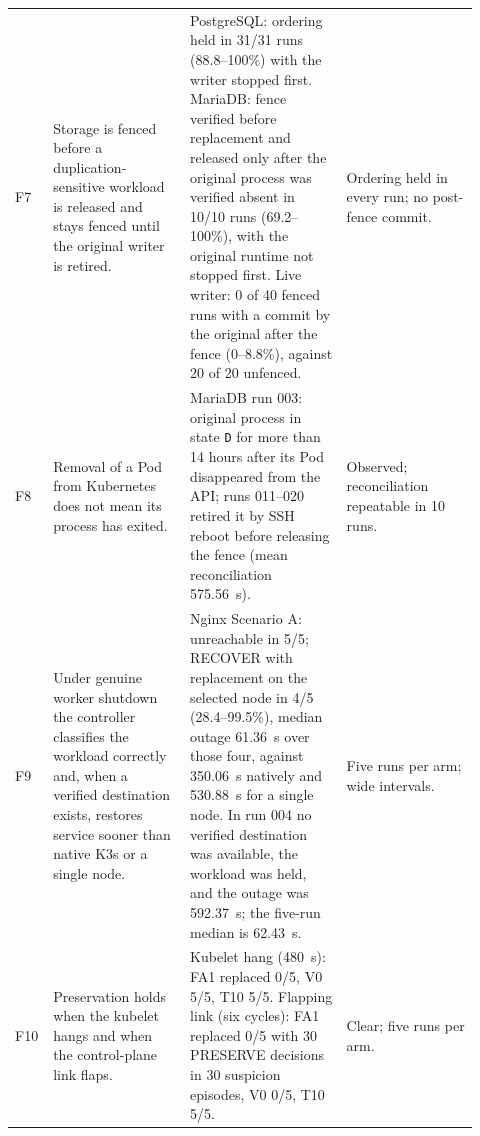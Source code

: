\documentclass[10pt]{article}
\begin{document}
\begin{table}[ht]
\begin{tabular}{@{}>{\RaggedRight\arraybackslash}p{0.04\linewidth}>{\RaggedRight\arraybackslash}p{0.29\linewidth}>{\RaggedRight\arraybackslash}p{0.32\linewidth}>{\RaggedRight\arraybackslash}p{0.27\linewidth}@{}}
F7 & Storage is fenced before a duplication-sensitive workload is released and stays fenced until the original writer is retired. & PostgreSQL: ordering held in 31/31 runs (88.8--100\%) with the writer stopped first. MariaDB: fence verified before replacement and released only after the original process was verified absent in 10/10 runs (69.2--100\%), with the original runtime not stopped first. Live writer: 0 of 40 fenced runs with a commit by the original after the fence (0--8.8\%), against 20 of 20 unfenced. & Ordering held in every run; no post-fence commit.\\
F8 & Removal of a Pod from Kubernetes does not mean its process has exited. & MariaDB run 003: original process in state \texttt{D} for more than 14 hours after its Pod disappeared from the API; runs 011--020 retired it by SSH reboot before releasing the fence (mean reconciliation 575.56~s). & Observed; reconciliation repeatable in 10 runs.\\
F9 & Under genuine worker shutdown the controller classifies the workload correctly and, when a verified destination exists, restores service sooner than native K3s or a single node. & Nginx Scenario A: unreachable in 5/5; RECOVER with replacement on the selected node in 4/5 (28.4--99.5\%), median outage 61.36~s over those four, against 350.06~s natively and 530.88~s for a single node. In run 004 no verified destination was available, the workload was held, and the outage was 592.37~s; the five-run median is 62.43~s. & Five runs per arm; wide intervals.\\
F10 & Preservation holds when the kubelet hangs and when the control-plane link flaps. & Kubelet hang (480~s): FA1 replaced 0/5, V0 5/5, T10 5/5. Flapping link (six cycles): FA1 replaced 0/5 with 30 PRESERVE decisions in 30 suspicion episodes, V0 0/5, T10 5/5. & Clear; five runs per arm.\\ \bottomrule
\end{tabular}
\end{table}


\end{document}
